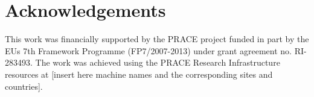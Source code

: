 \documentclass{prace}
\begin{document}
\section*{Acknowledgements}
This work was financially supported by the PRACE project funded in part
by the EUs 7th Framework Programme (FP7/2007-2013) under grant agreement
no. RI-283493. The work was achieved using the PRACE Research Infrastructure
resources at [insert here machine names and the corresponding sites and
countries].

%
\begin{thebibliography}{99}
	\bibitem{}
\end{thebibliography}

\end{document}
